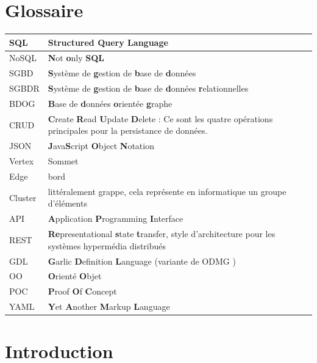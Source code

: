 \documentclass[a4paper,fleqn,12pt,oneside]{report}
\begin{document}
\chapter*{Glossaire}
\begin{center}
\begin{tabular}[c]{ l p{14cm} }
 SQL  & \textbf{S}tructured \textbf{Q}uery \textbf{L}anguage \\ \hline
 NoSQL  & \textbf{N}ot \textbf{o}nly \textbf{SQL} \\ \hline
 SGBD  & \textbf{S}ystème de \textbf{g}estion de \textbf{b}ase de \textbf{d}onnées \\ \hline
 SGBDR  & \textbf{S}ystème de \textbf{g}estion de \textbf{b}ase de \textbf{d}onnées \textbf{r}elationnelles \\ \hline
 BDOG  & \textbf{B}ase de \textbf{d}onnées \textbf{o}rientée \textbf{g}raphe \\ \hline
 CRUD  & \textbf{C}reate \textbf{R}ead \textbf{U}pdate \textbf{D}elete : Ce sont les quatre opérations principales pour la persistance de données. \\ \hline
 JSON  & \textbf{J}ava\textbf{S}cript \textbf{O}bject \textbf{N}otation \\ \hline
 Vertex  & Sommet \\ \hline
 Edge  & bord \\ \hline
 Cluster  & littéralement grappe, cela représente en informatique un groupe d'éléments \\ \hline
 API  & \textbf{A}pplication \textbf{P}rogramming \textbf{I}nterface  \\ \hline
 REST  & \textbf{Re}presentational \textbf{s}tate \textbf{t}ransfer, style d'architecture pour les systèmes hypermédia distribués \\ \hline
 GDL & \textbf{G}arlic \textbf{D}efinition \textbf{L}anguage (variante de ODMG \cite{cattell1997object}) \\ \hline
 OO & \textbf{O}rienté \textbf{O}bjet \\ \hline
 POC & \textbf{P}roof \textbf{O}f \textbf{C}oncept \\ \hline
 YAML & \textbf{Y}et \textbf{A}nother \textbf{M}arkup \textbf{L}anguage \\ \hline
\end{tabular}
\end{center}
\clearpage
\setcounter{page}{1}
\chapter{Introduction}
\end{document}
